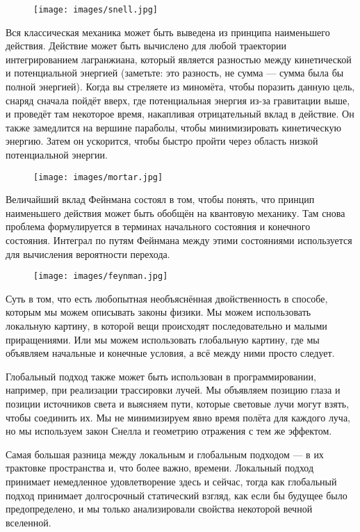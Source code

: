 \begin{figure}[H]
  \centering
  \texttt{[image: images/snell.jpg]}
\end{figure}

\noindent
Вся классическая механика может быть выведена из принципа наименьшего
действия. Действие может быть вычислено для любой траектории интегрированием
лагранжиана, который является разностью между кинетической и потенциальной
энергией (заметьте: это разность, не сумма --- сумма была бы
полной энергией). Когда вы стреляете из миномёта, чтобы поразить данную цель,
снаряд сначала пойдёт вверх, где потенциальная энергия из-за гравитации
выше, и проведёт там некоторое время, накапливая отрицательный вклад в
действие. Он также замедлится на вершине параболы, чтобы
минимизировать кинетическую энергию. Затем он ускорится, чтобы быстро пройти через
область низкой потенциальной энергии.

\begin{figure}[H]
  \centering
  \texttt{[image: images/mortar.jpg]}
\end{figure}

\noindent
Величайший вклад Фейнмана состоял в том, чтобы понять, что принцип
наименьшего действия может быть обобщён на квантовую механику. Там снова
проблема формулируется в терминах начального состояния и конечного состояния.
Интеграл по путям Фейнмана между этими состояниями используется для вычисления
вероятности перехода.

\begin{figure}[H]
  \centering
  \texttt{[image: images/feynman.jpg]}
\end{figure}

\noindent
Суть в том, что есть любопытная необъяснённая двойственность в способе, которым мы
можем описывать законы физики. Мы можем использовать локальную картину, в которой
вещи происходят последовательно и малыми приращениями. Или мы можем использовать
глобальную картину, где мы объявляем начальные и конечные условия, а
всё между ними просто следует.

Глобальный подход также может быть использован в программировании, например, при
реализации трассировки лучей. Мы объявляем позицию глаза и
позиции источников света и выясняем пути, которые световые лучи
могут взять, чтобы соединить их. Мы не минимизируем явно время
полёта для каждого луча, но мы используем закон Снелла и геометрию
отражения с тем же эффектом.

Самая большая разница между локальным и глобальным подходом --- в
их трактовке пространства и, что более важно, времени. Локальный подход
принимает немедленное удовлетворение здесь и сейчас, тогда как глобальный
подход принимает долгосрочный статический взгляд, как если бы будущее было
предопределено, и мы только анализировали свойства некоторой вечной
вселенной.

